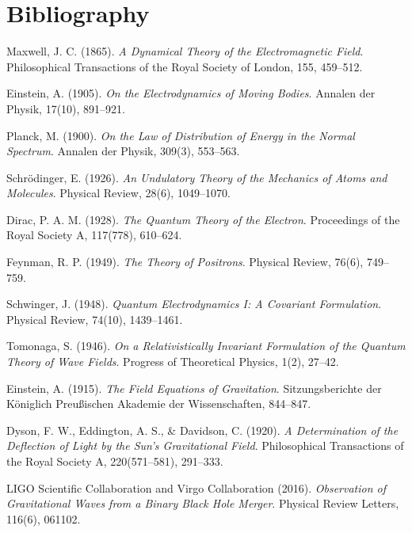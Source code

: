 \documentclass[%
 reprint,
 amsmath,amssymb,
 aps,
 pra,
 longbibliography,
 nofootinbib
]{revtex4-2}
\begin{document}
\chapter{Bibliography}



\begin{thebibliography}{99}

Maxwell, J. C. (1865).
\textit{A Dynamical Theory of the Electromagnetic Field}.
Philosophical Transactions of the Royal Society of London, 155, 459–512.

Einstein, A. (1905).
\textit{On the Electrodynamics of Moving Bodies}.
Annalen der Physik, 17(10), 891–921.

Planck, M. (1900).
\textit{On the Law of Distribution of Energy in the Normal Spectrum}.
Annalen der Physik, 309(3), 553–563.

Schrödinger, E. (1926).
\textit{An Undulatory Theory of the Mechanics of Atoms and Molecules}.
Physical Review, 28(6), 1049–1070.

Dirac, P. A. M. (1928).
\textit{The Quantum Theory of the Electron}.
Proceedings of the Royal Society A, 117(778), 610–624.

Feynman, R. P. (1949).
\textit{The Theory of Positrons}.
Physical Review, 76(6), 749–759.

Schwinger, J. (1948).
\textit{Quantum Electrodynamics I: A Covariant Formulation}.
Physical Review, 74(10), 1439–1461.

Tomonaga, S. (1946).
\textit{On a Relativistically Invariant Formulation of the Quantum Theory of Wave Fields}.
Progress of Theoretical Physics, 1(2), 27–42.

Einstein, A. (1915).
\textit{The Field Equations of Gravitation}.
Sitzungsberichte der Königlich Preußischen Akademie der Wissenschaften, 844–847.

Dyson, F. W., Eddington, A. S., \& Davidson, C. (1920).
\textit{A Determination of the Deflection of Light by the Sun's Gravitational Field}.
Philosophical Transactions of the Royal Society A, 220(571–581), 291–333.

LIGO Scientific Collaboration and Virgo Collaboration (2016).
\textit{Observation of Gravitational Waves from a Binary Black Hole Merger}.
Physical Review Letters, 116(6), 061102.


\end{thebibliography}
\end{document}
